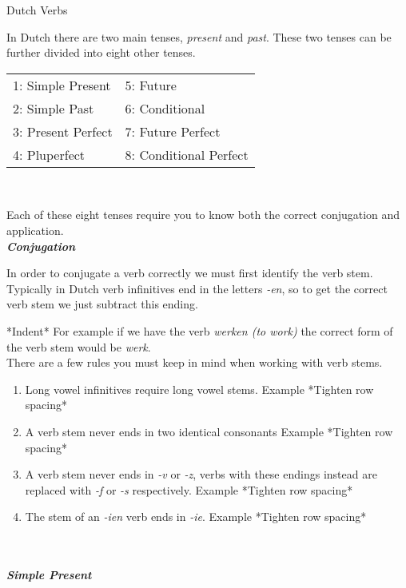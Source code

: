 \documentclass[letterpaper,11pt]{article}
\begin{document}
\begin{center}
    \LARGE{Dutch Verbs}
\end{center}
\par{In Dutch there are two main tenses, \textit{present} and \textit{past}.
These two tenses can be further divided into eight other tenses.}
\\
\begin{tabular}[t]{l l}
    1: Simple Present  & 5: Future              \\
    2: Simple Past     & 6: Conditional         \\
    3: Present Perfect & 7: Future Perfect      \\
    4: Pluperfect      & 8: Conditional Perfect \\
\end{tabular}
\\
\par{Each of these eight tenses require you to know both the correct conjugation
    and application.}
\\ 
\textbf{\textit{Conjugation}}
\par{In order to conjugate a verb correctly we must first identify the verb stem.
    Typically in Dutch verb infinitives end in the letters \textit{-en}, so to
    get the correct verb stem we just subtract this ending.}
    \par{*Indent* For example if we have the verb \textit{werken (to work)} the correct form of
    the verb stem would be \textit{werk}.}
\\ 
There are a few rules you must keep in mind when working with verb stems.
\begin{enumerate} %
    \item Long vowel infinitives require long vowel stems.
        \subitem Example *Tighten row spacing*
    \item A verb stem never ends in two identical consonants
        \subitem Example *Tighten row spacing*
    \item A verb stem never ends in \textit{-v} or \textit{-z}, verbs with these
        endings instead are replaced with \textit{-f} or \textit{-s} respectively.
        \subitem Example *Tighten row spacing*
    \item The stem of an \textit{-ien} verb ends in \textit{-ie}.
        \subitem Example *Tighten row spacing*
\end{enumerate}
\\ \\
\textbf{\textit{Simple Present}}
\end{document}

